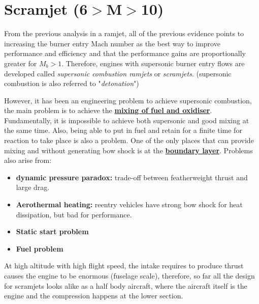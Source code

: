 \documentclass[a4paper,10pt]{article}
\begin{document}
\vspace*{-0.5cm}
\section{Scramjet (6$>$M$>$10)}
From the previous analysis in a ramjet, all of the previous evidence points to increasing the burner entry Mach number as the best way to improve performance and efficiency and that the performance gains are proportionally greater for $M_b>1$. Therefore, engines with supersonic burner entry flows are developed called \textit{supersonic combustion ramjets} or \textit{scramjets}. (supersonic combustion is also referred to "\textit{detonation}")\par

However, it has been an engineering problem to achieve supersonic combustion, the main problem is to achieve the \underline{\textbf{mixing of fuel and oxidiser}}. Fundamentally, it is impossible to achieve both supersonic and good mixing at the same time. Also, being able to put in fuel and retain for a finite time for reaction to take place is also a problem. One of the only places that can provide mixing and without generating bow shock is at the \underline{\textbf{boundary layer}}. Problems also arise from:
\begin{itemize}
    \item \textbf{dynamic pressure paradox:} trade-off between featherweight thrust and large drag.
    \item \textbf{Aerothermal heating:} reentry vehicles have strong bow shock for heat dissipation, but bad for performance. 
    \vspace*{-0.2cm}
    \item \textbf{Static start problem}
    \item \textbf{Fuel problem}
\end{itemize}

At high altitude with high flight speed, the intake requires to produce thrust causes the engine to be enormous (fuselage scale), therefore, so far all the design for scramjets looks alike as a half body aircraft, where the aircraft itself is the engine and the compression happens at the lower section. 

\newpage
\end{document}
